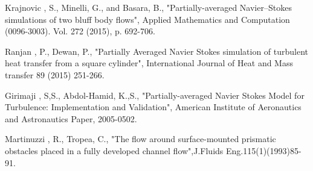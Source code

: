 \begin{thebibliography}{69}




 Krajnovic , S., Minelli, G., and Basara, B., "Partially-averaged Navier–Stokes simulations of two bluff body flows", Applied Mathematics and Computation (0096-3003). Vol. 272 (2015), p. 692-706.

 Ranjan , P., Dewan, P., "Partially Averaged Navier Stokes simulation of turbulent heat transfer from a square cylinder", International Journal of Heat and Mass transfer 89 (2015) 251-266.

 Girimaji , S,S., Abdol-Hamid, K.,S., "Partially-averaged Navier Stokes Model for Turbulence: Implementation and Validation", American Institute of Aeronautics and Astronautics Paper, 2005-0502.

 Martinuzzi , R., Tropea, C., "The flow around surface-mounted prismatic obstacles placed in a fully developed channel flow",J.Fluids Eng.115(1)(1993)85-91. 



\end{thebibliography}
